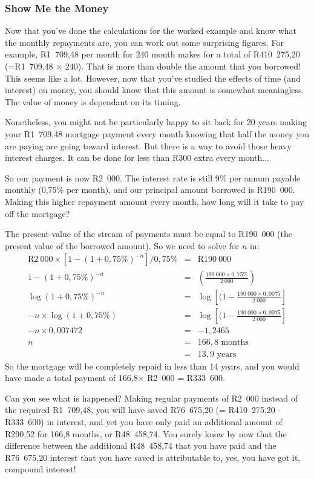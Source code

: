 \subsubsection{Show Me the Money}
Now that you've done the calculations for the worked example and know what the monthly repayments are, you can work out some surprising figures. For example, R1~709,48 per month for 240 month makes for a total of R410~275,20 (=R1~709,48 $\times$ 240). That is more than double the amount that you borrowed! This seems like a lot. However, now that you've studied the effects of time (and interest) on money, you should know that this amount is somewhat meaningless. The value of money is dependant on its timing.

Nonetheless, you might not be particularly happy to sit back for 20 years making your R1~709,48 mortgage payment every month knowing that half the money you are paying are going toward interest. But there is a way to avoid those heavy interest charges. It can be done for less than R300 extra every month...

So our payment is now R2~000. The interest rate is still 9\% per annum payable monthly (0,75\% per month), and our principal amount borrowed is R190~000. Making this higher repayment amount every month, how long will it take to pay off the mortgage?

The present value of the stream of payments must be equal to R190~000 (the present value of the borrowed amount). So we need to solve for $n$ in:
\begin{eqnarray*}
\mbox{R}2~000 \times [1 - (1 + 0,75\%)^{-n}]/0,75\% &=& \mbox{R}190~000\\
1 - (1 + 0,75\%)^{-n} &=& (\frac{190~000\times 0,75\%}{2~000})\\
\log(1+0,75\%)^{-n} &=& \log[(1 - \frac{190~000\times 0,0075}{2~000}]\\
-n\times \log(1+0,75\%) &=& \log[(1 - \frac{190~000\times 0,0075}{2~000}]\\
-n \times 0,007472 &=& -1,2465\\
n &=& 166,8 \mbox{ months}\\
& =& 13,9 \mbox{ years}
\end{eqnarray*}
So the mortgage will be completely repaid in less than 14 years, and you would have made a total payment of 166,8$\times$ R2~000 = R333~600.

Can you see what is happened? Making regular payments of R2~000 instead of the required R1~709,48, you will have saved R76~675,20 (= R410~275,20 - R333~600) in interest, and yet you have only paid an additional amount of R290,52 for 166,8 months, or R48~458,74. You surely know by now that the difference between the additional R48~458,74 that you have paid and the R76~675,20 interest that you have saved is attributable to, yes, you have got it, compound interest!

